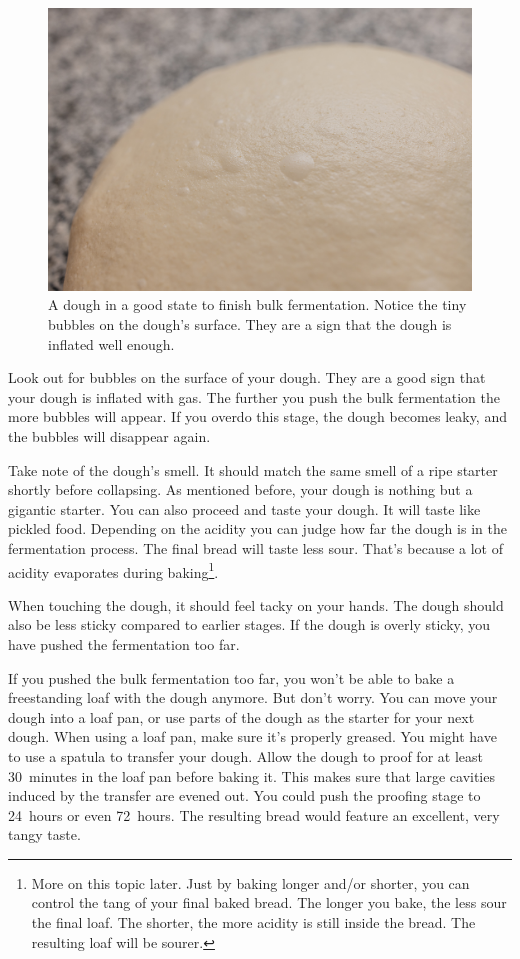\begin{figure}[!htb]
  \includegraphics[width=\textwidth]{bulk-finished-dough}
  \caption[Dough at the end of bulk fermentation]{A dough in a good state to
      finish bulk fermentation. Notice the tiny bubbles on the dough's surface.
      They are a sign that the dough is inflated well enough.}
\end{figure}

Look out for bubbles on the surface of your dough. They
are a good sign that your dough is inflated with gas. The
further you push the bulk fermentation the more bubbles
will appear. If you overdo this stage, the dough becomes leaky, and
the bubbles will disappear again.

Take note of the dough's smell. It should match the same
smell of a ripe starter shortly before collapsing. As mentioned
before, your dough is nothing but a gigantic starter. You
can also proceed and taste your dough. It will taste like
pickled food. Depending on the acidity you can judge how
far the dough is in the fermentation process. The final bread
will taste less sour. That's because a lot of acidity evaporates
during baking\footnote{More on this topic later.
Just by baking longer and/or shorter, you can control
the tang of your final baked bread. The longer
you bake, the less sour the final loaf. The shorter,
the more acidity is still inside the bread. The resulting
loaf will be sourer.}.

When touching the dough, it should feel tacky
on your hands. The dough should also be less sticky
compared to earlier stages. If the dough is overly
sticky, you have pushed the fermentation too far.

If you pushed the bulk fermentation too far, you won't be able
to bake a freestanding loaf with the dough anymore. But don't
worry. You can move your dough into a loaf pan, or use parts
of the dough as the starter for your next dough. When using
a loaf pan, make sure it's properly greased. You might have
to use a spatula to transfer your dough. Allow the dough
to proof for at least 30~minutes in the loaf pan before
baking it. This makes sure that large cavities induced
by the transfer are evened out. You could push the proofing
stage to 24~hours or even 72~hours. The resulting
bread would feature an excellent, very tangy taste.


